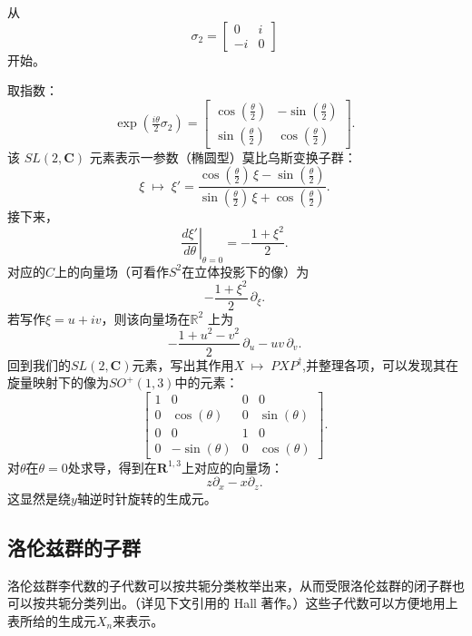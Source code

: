 从
\[
\sigma_{2} =
\begin{bmatrix}
0 & i \\
- i & 0
\end{bmatrix}~
\]
开始。

取指数：
\[
\exp\!\left(\tfrac{i\theta}{2}\sigma_{2}\right) =
\begin{bmatrix}
\cos\!\left(\tfrac{\theta}{2}\right) & -\sin\!\left(\tfrac{\theta}{2}\right) \\
\sin\!\left(\tfrac{\theta}{2}\right) & \cos\!\left(\tfrac{\theta}{2}\right)
\end{bmatrix}.~
\]
该 $SL(2,\mathbf{C})$ 元素表示一参数（椭圆型）莫比乌斯变换子群：
\[
\xi \;\mapsto\; \xi' = 
\frac{\cos\!\left(\tfrac{\theta}{2}\right)\,\xi - \sin\!\left(\tfrac{\theta}{2}\right)}
{\sin\!\left(\tfrac{\theta}{2}\right)\,\xi + \cos\!\left(\tfrac{\theta}{2}\right)}.~
\]
接下来，
\[
\left.\frac{d\xi'}{d\theta}\right|_{\theta = 0}
= -\frac{1+\xi^{2}}{2}.~
\]
对应的$C$上的向量场（可看作$S^{2}$在立体投影下的像）为
\[
-\frac{1+\xi^{2}}{2}\,\partial_{\xi}.~
\]
若写作$\xi = u + iv$，则该向量场在$\mathbb{R}^{2}$ 上为
\[
-\frac{1+u^{2}-v^{2}}{2}\,\partial_{u} - uv\,\partial_{v}.~
\]
回到我们的$SL(2,\mathbf{C})$元素，写出其作用$X \;\mapsto\; PXP^{\dagger}$,并整理各项，可以发现其在旋量映射下的像为$SO^{+}(1,3)$中的元素：
\[
\begin{bmatrix}
1 & 0 & 0 & 0 \\
0 & \cos(\theta) & 0 & \sin(\theta) \\
0 & 0 & 1 & 0 \\
0 & -\sin(\theta) & 0 & \cos(\theta)
\end{bmatrix}.~
\]
对$\theta$在$\theta=0$处求导，得到在$\mathbf{R}^{1,3}$上对应的向量场：
\[
z\partial_{x} - x\partial_{z}.~
\]
这显然是绕$y$轴逆时针旋转的生成元。
\subsection{洛伦兹群的子群}
洛伦兹群李代数的子代数可以按共轭分类枚举出来，从而受限洛伦兹群的闭子群也可以按共轭分类列出。（详见下文引用的 Hall 著作。）这些子代数可以方便地用上表所给的生成元$X_{n}$来表示。

